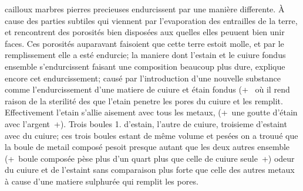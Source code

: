 cailloux\protect{} marbres\protect{} pierres precieuses endurcissent par une mani\`{e}re differente. \`{A} cause des parties subtiles qui viennent par l'evaporation\protect{} des entrailles de la terre\protect{}, et rencontrent des porosit\'{e}s\protect{} bien dispos\'{e}es aux quelles elles peuuent bien unir
faces.
Ces porosit\'{e}s\protect{} auparavant faisoient que cette terre\protect{} estoit molle, et par le remplissement elle a est\'{e} endurcie; la maniere dont l'estain\protect{} et le cuiure\protect{} fondus ensemble s'endurcissent faisant une composition beaucoup plus dure, explique encore cet endurcissement\protect{}; caus\'{e} par l'introduction d'une nouvelle substance comme l'endurcissement\protect{} d'une matiere de cuiure\protect{} et \'{e}tain\protect{} fondus 
(+~\textit{}
o\`{u} il rend raison de la sterilit\'{e} des
 que l'etain\protect{} penetre les pores du cuiure\protect{} et les remplit. Effectivement l'etain\protect{} s'allie aisement avec tous les metaux, (+~une goutte\protect{} d'\'{e}tain\protect{}
avec l'argent\protect{}~+).
Trois boules 1. d'estain\protect{}, l'autre de cuiure\protect{}, troisieme d'estaint\protect{} avec du cuiure\protect{}; ces trois boules estant de même volume et pes\'{e}es on a trouu\'{e} que la boule de metail compos\'{e} pesoit presque autant que les deux autres ensemble (+~boule compos\'{e}e p\`{e}se plus d'un quart plus que celle de cuiure\protect{} seule~+) odeur du cuiure\protect{} et de l'estaint\protect{} sans comparaison plus forte que celle des autres metaux \`{a} cause d'une matiere sulphur\'{e}e qui remplit les pores.%

